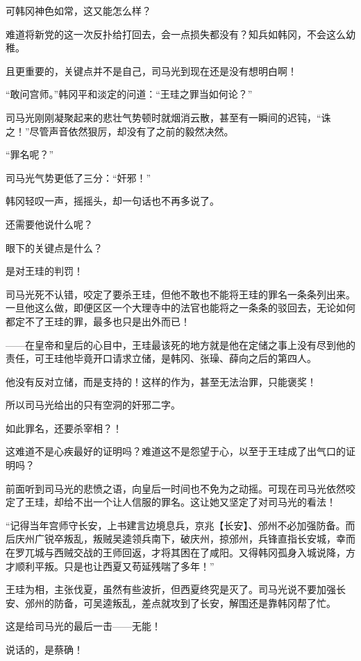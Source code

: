 可韩冈神色如常，这又能怎么样？

难道将新党的这一次反扑给打回去，会一点损失都没有？知兵如韩冈，不会这么幼稚。

且更重要的，关键点并不是自己，司马光到现在还是没有想明白啊！

“敢问宫师。”韩冈平和淡定的问道：“王珪之罪当如何论？”

司马光刚刚凝聚起来的悲壮气势顿时就烟消云散，甚至有一瞬间的迟钝，“诛之！”尽管声音依然狠厉，却没有了之前的毅然决然。

“罪名呢？”

司马光气势更低了三分：“奸邪！”

韩冈轻叹一声，摇摇头，却一句话也不再多说了。

还需要他说什么呢？

眼下的关键点是什么？

是对王珪的判罚！

司马光死不认错，咬定了要杀王珪，但他不敢也不能将王珪的罪名一条条列出来。一旦他这么做，即便区区一个大理寺中的法官也能将之一条条的驳回去，无论如何都定不了王珪的罪，最多也只是出外而已！

——在皇帝和皇后的心目中，王珪最该死的地方就是他在定储之事上没有尽到他的责任，可王珪他毕竟开口请求立储，是韩冈、张璪、薛向之后的第四人。

他没有反对立储，而是支持的！这样的作为，甚至无法治罪，只能褒奖！

所以司马光给出的只有空洞的奸邪二字。

如此罪名，还要杀宰相？！

这难道不是心疾最好的证明吗？难道这不是怨望于心，以至于王珪成了出气口的证明吗？

前面听到司马光的悲愤之语，向皇后一时间也不免为之动摇。可现在司马光依然咬定了王珪，却给不出一个让人信服的罪名。这让她又坚定了对司马光的看法！

“记得当年宫师守长安，上书建言边境息兵，京兆【长安】、邠州不必加强防备。而后庆州广锐卒叛乱，叛贼吴逵领兵南下，破庆州，掠邠州，兵锋直指长安城，幸而在罗兀城与西贼交战的王师回返，才将其困在了咸阳。又得韩冈孤身入城说降，方才顺利平叛。只是也让西夏又苟延残喘了多年！”

王珪为相，主张伐夏，虽然有些波折，但西夏终究是灭了。司马光说不要加强长安、邠州的防备，可吴逵叛乱，差点就攻到了长安，解围还是靠韩冈帮了忙。

这是给司马光的最后一击——无能！

说话的，是蔡确！

